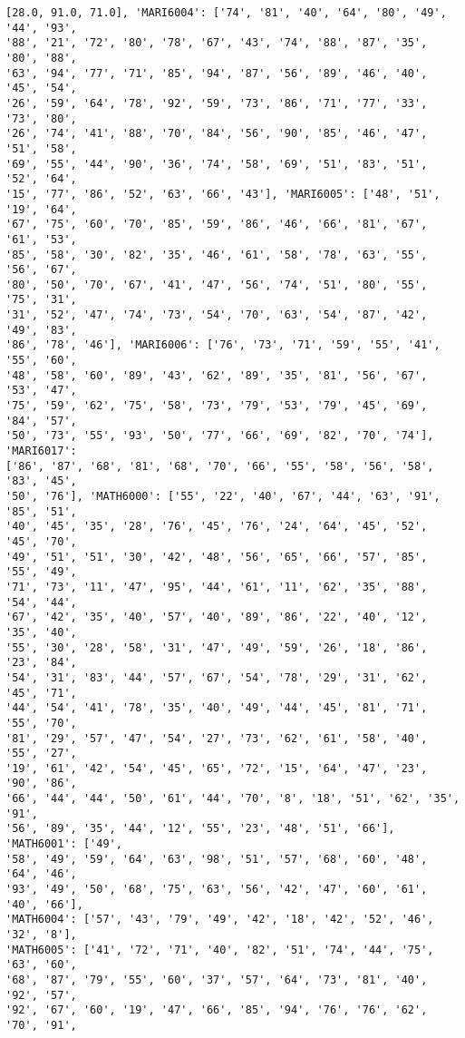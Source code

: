 \documentclass[11pt]{article}
\begin{document}
\begin{Verbatim}[commandchars=\\\{\}]
[28.0, 91.0, 71.0], 'MARI6004': ['74', '81', '40', '64', '80', '49', '44', '93',
'88', '21', '72', '80', '78', '67', '43', '74', '88', '87', '35', '80', '88',
'63', '94', '77', '71', '85', '94', '87', '56', '89', '46', '40', '45', '54',
'26', '59', '64', '78', '92', '59', '73', '86', '71', '77', '33', '73', '80',
'26', '74', '41', '88', '70', '84', '56', '90', '85', '46', '47', '51', '58',
'69', '55', '44', '90', '36', '74', '58', '69', '51', '83', '51', '52', '64',
'15', '77', '86', '52', '63', '66', '43'], 'MARI6005': ['48', '51', '19', '64',
'67', '75', '60', '70', '85', '59', '86', '46', '66', '81', '67', '61', '53',
'85', '58', '30', '82', '35', '46', '61', '58', '78', '63', '55', '56', '67',
'80', '50', '70', '67', '41', '47', '56', '74', '51', '80', '55', '75', '31',
'31', '52', '47', '74', '73', '54', '70', '63', '54', '87', '42', '49', '83',
'86', '78', '46'], 'MARI6006': ['76', '73', '71', '59', '55', '41', '55', '60',
'48', '58', '60', '89', '43', '62', '89', '35', '81', '56', '67', '53', '47',
'75', '59', '62', '75', '58', '73', '79', '53', '79', '45', '69', '84', '57',
'50', '73', '55', '93', '50', '77', '66', '69', '82', '70', '74'], 'MARI6017':
['86', '87', '68', '81', '68', '70', '66', '55', '58', '56', '58', '83', '45',
'50', '76'], 'MATH6000': ['55', '22', '40', '67', '44', '63', '91', '85', '51',
'40', '45', '35', '28', '76', '45', '76', '24', '64', '45', '52', '45', '70',
'49', '51', '51', '30', '42', '48', '56', '65', '66', '57', '85', '55', '49',
'71', '73', '11', '47', '95', '44', '61', '11', '62', '35', '88', '54', '44',
'67', '42', '35', '40', '57', '40', '89', '86', '22', '40', '12', '35', '40',
'55', '30', '28', '58', '31', '47', '49', '59', '26', '18', '86', '23', '84',
'54', '31', '83', '44', '57', '67', '54', '78', '29', '31', '62', '45', '71',
'44', '54', '41', '78', '35', '40', '49', '44', '45', '81', '71', '55', '70',
'81', '29', '57', '47', '54', '27', '73', '62', '61', '58', '40', '55', '27',
'19', '61', '42', '54', '45', '65', '72', '15', '64', '47', '23', '90', '86',
'66', '44', '44', '50', '61', '44', '70', '8', '18', '51', '62', '35', '91',
'56', '89', '35', '44', '12', '55', '23', '48', '51', '66'], 'MATH6001': ['49',
'58', '49', '59', '64', '63', '98', '51', '57', '68', '60', '48', '64', '46',
'93', '49', '50', '68', '75', '63', '56', '42', '47', '60', '61', '40', '66'],
'MATH6004': ['57', '43', '79', '49', '42', '18', '42', '52', '46', '32', '8'],
'MATH6005': ['41', '72', '71', '40', '82', '51', '74', '44', '75', '63', '60',
'68', '87', '79', '55', '60', '37', '57', '64', '73', '81', '40', '92', '57',
'92', '67', '60', '19', '47', '66', '85', '94', '76', '76', '62', '70', '91',

\end{Verbatim}
\end{document}
